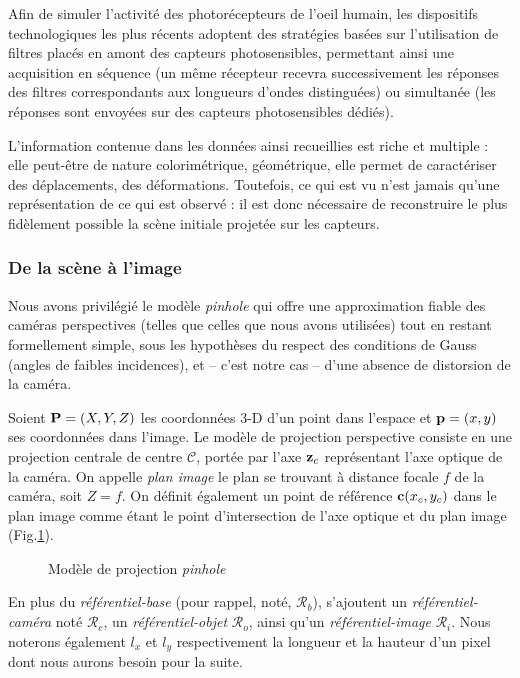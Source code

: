  Afin de simuler l'activité des photorécepteurs de l'oeil humain, les dispositifs technologiques les plus récents adoptent des stratégies basées sur l'utilisation de filtres placés en amont des capteurs photosensibles, permettant ainsi une acquisition en séquence (un même récepteur recevra successivement les réponses des filtres correspondants aux longueurs d'ondes distinguées) ou simultanée (les réponses sont envoyées sur des capteurs photosensibles dédiés).
  
L'information contenue dans les données ainsi recueillies est riche et multiple : elle peut-être de nature colorimétrique, géométrique, elle permet de ca\-ractériser des déplacements, des déformations. Toutefois, ce qui est vu n'est jamais qu'une représentation de ce qui est observé : il est donc nécessaire de reconstruire le plus fidèlement possible la scène initiale projetée sur les capteurs.
 
\subsubsection{De la scène à l'image}
 
Nous avons privilégié le modèle {\it pinhole} qui offre une approximation fiable des caméras perspectives (telles que celles que nous avons utilisées) tout en restant formellement simple\cite{Faugeras:1993}, sous les hypothèses du respect des conditions de Gauss (angles de faibles incidences), et -- c'est notre cas -- d'une absence de distorsion de la caméra.

Soient ${\bf P} = (X, Y, Z)$ les coordonnées 3-D d'un point dans l'espace et ${\bf p} = (x, y)$ ses coordonnées dans l'image. Le modèle de projection perspective consiste en une projection centrale de centre $\mathcal C$, portée par l'axe ${\bf z}_c$ représentant l'axe optique de la caméra. On appelle {\it plan image} le plan se trouvant à distance focale $f$ de la caméra, soit $Z = f$. On définit également un point de référence ${\bf c}(x_c,y_c)$ dans le plan image comme étant le point d'intersection de l'axe optique et du plan image (Fig.\ref{intro:fig12}).

\begin{figure}[h!tp]
  \centering
  \def\svgwidth{.95\linewidth}
  
    \caption{\footnotesize{Modèle de projection {\it pinhole}}}
\label{intro:fig12}
\end{figure}

En plus du {\it référentiel-base} (pour rappel, noté, $\mathcal R_b$), s'ajoutent un {\it référentiel-caméra} noté $\mathcal R_c$, un {\it référentiel-objet} $\mathcal R_o$, ainsi qu'un {\it référentiel-image} $\mathcal R_i$. Nous noterons également $l_x$ et $l_y$ respectivement la longueur et la hauteur d'un pixel dont nous aurons besoin pour la suite.

